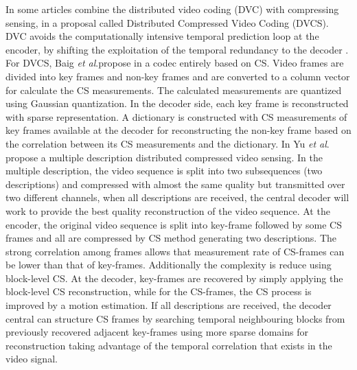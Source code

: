 In some articles combine the distributed video coding (DVC) with compressing sensing, in a proposal called Distributed Compressed Video Coding (DVCS). DVC avoids the computationally intensive temporal prediction  loop at the encoder, by shifting the exploitation of the temporal redundancy to the decoder \cite{5202822} . For DVCS,  Baig \emph{et al}.propose in \cite{6266276} a codec entirely based on CS. Video frames are divided into key frames and non-key frames and are converted to a column vector for calculate the CS measurements. The calculated measurements are quantized using Gaussian quantization. In the decoder side, each key frame is reconstructed with sparse representation. A dictionary is constructed with CS measurements of key frames available at the decoder for reconstructing the non-key frame based on the correlation between its CS measurements and the dictionary. In \cite{6245804} Yu \emph{et al}. propose a multiple description distributed compressed video sensing. In the multiple description, the video sequence is split into two subsequences (two   descriptions) and compressed with almost the same quality  but  transmitted  over  two  different channels, when all descriptions are received, the central decoder will work to provide  the  best  quality  reconstruction  of  the  video  sequence. At the encoder, the original video sequence is split into key-frame followed by some CS frames and all are compressed by CS method generating two descriptions. The strong  correlation among frames allows that measurement rate of CS-frames can be lower than that of key-frames. Additionally the complexity is reduce using block-level CS. At the decoder, key-frames are recovered by simply applying the block-level CS reconstruction, while for the CS-frames, the CS process is improved by a motion estimation. If all descriptions are received, the decoder central can structure CS frames by searching temporal neighbouring blocks from previously recovered adjacent key-frames using more sparse domains for reconstruction taking advantage of the temporal correlation that exists in the video signal. \\

